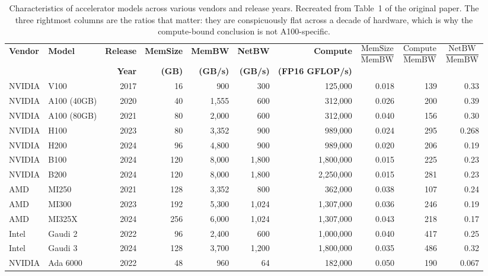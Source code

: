 \documentclass[manuscript,review]{acmart}
\newcommand{\membw}{\mathrm{MemBW}}
\newcommand{\memsize}{\mathrm{MemSize}}
\newcommand{\compute}{\mathrm{Compute}}
\newcommand{\netbw}{\mathrm{NetBW}}
\begin{document}
\begin{table}[t]
\centering
\caption{Characteristics of accelerator models across various vendors and release years. Recreated from 
Table~1 of the original paper. The three rightmost columns are the ratios that matter: they are conspicuously 
flat across a decade of hardware, which is why the compute-bound conclusion is not A100-specific.}
\label{tab:accelerators}
\small
\begin{tabular}{llrrrrrrrr}
\toprule
\textbf{Vendor} & \textbf{Model} & \textbf{Release} & \textbf{MemSize} &
\textbf{MemBW} & \textbf{NetBW} & \textbf{Compute} &
$\dfrac{\memsize}{\membw}$ & $\dfrac{\compute}{\membw}$ &
$\dfrac{\netbw}{\membw}$ \\
 & & \textbf{Year} & \textbf{(GB)} & \textbf{(GB/s)} & \textbf{(GB/s)} &
\textbf{(FP16 GFLOP/s)} & & & \\
\midrule
NVIDIA & V100        & 2017 & 16  & 900   & 300   & 125{,}000   & 0.018 & 139 & 0.33  \\
NVIDIA & A100 (40GB) & 2020 & 40  & 1{,}555 & 600 & 312{,}000   & 0.026 & 200 & 0.39  \\
NVIDIA & A100 (80GB) & 2021 & 80  & 2{,}000 & 600 & 312{,}000   & 0.040 & 156 & 0.30  \\
NVIDIA & H100        & 2023 & 80  & 3{,}352 & 900 & 989{,}000   & 0.024 & 295 & 0.268 \\
NVIDIA & H200        & 2024 & 96  & 4{,}800 & 900 & 989{,}000   & 0.020 & 206 & 0.19  \\
NVIDIA & B100        & 2024 & 120 & 8{,}000 & 1{,}800 & 1{,}800{,}000 & 0.015 & 225 & 0.23 \\
NVIDIA & B200        & 2024 & 120 & 8{,}000 & 1{,}800 & 2{,}250{,}000 & 0.015 & 281 & 0.23 \\
AMD    & MI250       & 2021 & 128 & 3{,}352 & 800 & 362{,}000   & 0.038 & 107 & 0.24  \\
AMD    & MI300       & 2023 & 192 & 5{,}300 & 1{,}024 & 1{,}307{,}000 & 0.036 & 246 & 0.19 \\
AMD    & MI325X      & 2024 & 256 & 6{,}000 & 1{,}024 & 1{,}307{,}000 & 0.043 & 218 & 0.17 \\
Intel  & Gaudi 2     & 2022 & 96  & 2{,}400 & 600 & 1{,}000{,}000 & 0.040 & 417 & 0.25 \\
Intel  & Gaudi 3     & 2024 & 128 & 3{,}700 & 1{,}200 & 1{,}800{,}000 & 0.035 & 486 & 0.32 \\
NVIDIA & Ada 6000    & 2022 & 48  & 960   & 64    & 182{,}000   & 0.050 & 190 & 0.067 \\
\bottomrule
\end{tabular}
\end{table}
\end{document}
